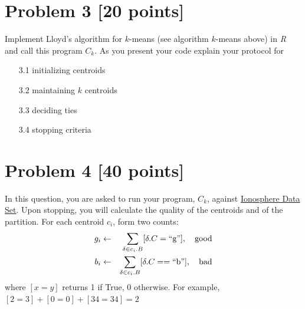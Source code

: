 \documentclass{article}
\newcommand{\quotes}[1]{``#1''}
\begin{document}


\section*{Problem 3 [20 points]} 

 Implement Lloyd's algorithm for $k$-means (see algorithm $k$-means above)  in \textit{R} and call this program $C_k$. As you present your code explain your protocol for


\begin{enumerate}
  \item[3.1] initializing centroids
  \item[3.2] maintaining $k$ centroids
  \item[3.3]  deciding ties
  \item[3.4] stopping criteria
\end{enumerate}




 
\section*{Problem 4 [40 points]}
 
 In this question, you are asked to run  your program, $C_k$, against   \href{https://archive.ics.uci.edu/ml/datasets/ionosphere}{
Ionosphere Data Set}. Upon stopping, you will calculate the quality of the centroids and of the partition.  For each centroid $c_i$, form two counts:
  \begin{eqnarray*}
  g_i &\gets& \sum_{\delta \in c_i.B} [\delta.C =\text{\quotes{g}}],\ \ \ \mbox{\rm good}\\
  b_i &\gets& \sum_{\delta \in c_i.B} [\delta.C = =\text{\quotes{b}}], \ \ \ \mbox{\rm bad}
  \end{eqnarray*}
  where $[x = y]$ returns 1 if True, 0 otherwise.  For example, $[2 = 3] + [0 = 0] + [34 = 34] = 2$
  
\end{document}
